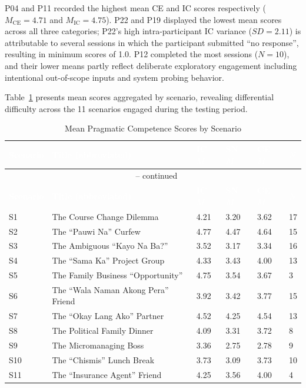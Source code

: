 \noindent P04 and P11 recorded the highest mean CE and IC scores respectively ($M_{\text{CE}} = 4.71$ and $M_{\text{IC}} = 4.75$). P22 and P19 displayed the lowest mean scores across all three categories; P22's high intra-participant IC variance ($SD = 2.11$) is attributable to several sessions in which the participant submitted ``no response'', resulting in minimum scores of 1.0. P12 completed the most sessions ($N = 10$), and their lower means partly reflect deliberate exploratory engagement including intentional out-of-scope inputs and system probing behavior.

Table~\ref{tab:per-scenario-means} presents mean scores aggregated by scenario, revealing differential difficulty across the 11 scenarios engaged during the testing period.

\begin{longtable}{p{1.5cm} p{3.5cm} p{2cm} p{2cm} p{2cm} p{1.5cm}}
\caption{Mean Pragmatic Competence Scores by Scenario}
\label{tab:per-scenario-means} \\

\rowcolor{headerblue}
\textcolor{white}{\textbf{Scenario}} &
\textcolor{white}{\textbf{Title (abbreviated)}} &
\textcolor{white}{\textbf{IC $M$}} &
\textcolor{white}{\textbf{SN $M$}} &
\textcolor{white}{\textbf{CE $M$}} &
\textcolor{white}{\textbf{$N$}} \\
\endfirsthead
\multicolumn{6}{c}{\tablename\ \thetable{} -- continued} \\
\rowcolor{headerblue}
\textcolor{white}{\textbf{Scenario}} &
\textcolor{white}{\textbf{Title (abbreviated)}} &
\textcolor{white}{\textbf{IC $M$}} &
\textcolor{white}{\textbf{SN $M$}} &
\textcolor{white}{\textbf{CE $M$}} &
\textcolor{white}{\textbf{$N$}} \\
\endhead

\midrule
S1  & The Course Change Dilemma          & 4.21 & 3.20 & 3.62 & 17 \\
\midrule
S2  & The ``Pauwi Na'' Curfew            & 4.77 & 4.47 & 4.64 & 15 \\
\midrule
S3  & The Ambiguous ``Kayo Na Ba?''      & 3.52 & 3.17 & 3.34 & 16 \\
\midrule
S4  & The ``Sama Ka'' Project Group      & 4.33 & 3.43 & 4.00 & 13 \\
\midrule
S5  & The Family Business ``Opportunity'' & 4.75 & 3.54 & 3.67 & 3  \\
\midrule
S6  & The ``Wala Naman Akong Pera'' Friend & 3.92 & 3.42 & 3.77 & 15 \\
\midrule
S7  & The ``Okay Lang Ako'' Partner      & 4.52 & 4.25 & 4.54 & 13 \\
\midrule
S8  & The Political Family Dinner        & 4.09 & 3.31 & 3.72 & 8  \\
\midrule
S9  & The Micromanaging Boss             & 3.36 & 2.75 & 2.78 & 9  \\
\midrule
S10 & The ``Chismis'' Lunch Break        & 3.73 & 3.09 & 3.73 & 10 \\
\midrule
S11 & The ``Insurance Agent'' Friend     & 4.25 & 3.56 & 4.00 & 4 \\
\bottomrule
\end{longtable}

